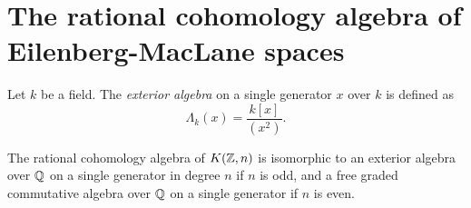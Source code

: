 \documentclass[../main.tex]{subfiles}
\begin{document}
\section{The rational cohomology algebra of Eilenberg-MacLane spaces}
\begin{definition}
   Let \( k \) be a field. The \emph{exterior algebra} on a single
   generator \( x \) over \( k \) is defined as
   \begin{equation}
       \Lambda_k(x)=\frac{k[x]}{(x^2)}.
   \end{equation}
\end{definition}
\begin{theorem}
\label{thm:eil-mac}
The rational cohomology algebra of \( K(\mathbb{Z}, n) \)
is isomorphic to
an exterior algebra over \( \mathbb{Q} \)  on a single generator in degree \( n \)
if \( n \) is odd, and a free graded commutative algebra over \( \mathbb{Q} \) 
on a single generator if \( n \) is even.
    
\end{theorem}
\end{document}
